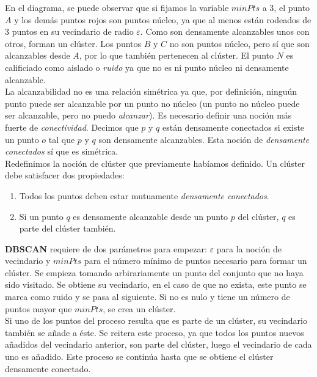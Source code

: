 \documentclass[a4paper, 12pt, spanish]{article}
\begin{document}
En el diagrama, se puede observar que si fijamos la variable $minPts$ a 3, el punto $A$ y los dem\'as puntos rojos son puntos n\'ucleo, ya que al menos est\'an rodeados de $3$ puntos en su vecindario de radio $\varepsilon$. Como son densamente alcanzables unos con otros, forman un cl\'uster. Los puntos $B$ y $C$ no son puntos n\'ucleo, pero s\'i que son alcanzables desde $A$, por lo que tambi\'en pertenecen al cl\'uster. El punto $N$ es calificiado como aislado o \textit{ruido} ya que no es ni punto n\'ucleo ni densamente alcanzable. \\

La alcanzabilidad no es una relaci\'on sim\'etrica ya que, por definici\'on, ningu\'un punto puede ser alcanzable por un punto no n\'ucleo (un punto no n\'ucleo puede ser alcanzable, pero no puedo \textit{alcanzar}). Es necesario definir una noci\'on m\'as fuerte de \textit{conectividad}. Decimos que $p$ y $q$ est\'an densamente conectados si existe un punto $o$ tal que $p$ y $q$ son densamente alcanzables. Esta noci\'on de \textit{densamente conectados} s\'i que es sim\'etrica.\\

Redefinimos la noci\'on de cl\'uster que previamente hab\'iamos definido. Un cl\'uster debe satisfacer dos propiedades:\\

\begin{enumerate}
	\item Todos los puntos deben estar mutuamente \textit{densamente conectados}.
	\item Si un punto $q$ es densamente alcanzable desde un punto $p$ del cl\'uster, $q$ es parte del cl\'uster tambi\'en. 
\end{enumerate}

\textbf{DBSCAN} requiere de dos par\'ametros para empezar: $\varepsilon$ para la noci\'on de vecindario y $minPts$ para el n\'umero m\'inimo de puntos necesario para formar un cl\'uster. Se empieza tomando arbirariamente un punto del conjunto que no haya sido visitado. Se obtiene su vecindario, en el caso de que no exista, este punto se marca como ruido y se pasa al siguiente. Si no es nulo y tiene un n\'umero de puntos mayor que $minPts$, se crea un cl\'uster. \\

Si uno de los puntos del proceso resulta que es parte de un cl\'uster, su vecindario tambi\'en se a\~nade a \'este. Se reitera este proceso, ya que todos los puntos nuevos a\~nadidos del vecindario anterior, son parte del cl\'uster, luego el vecindario de cada uno es a\~nadido. Este proceso se contin\'ua hasta que se obtiene el cl\'uster densamente conectado. \\
\end{document}
